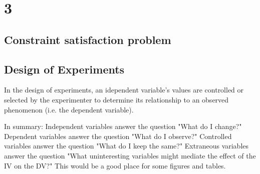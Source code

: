 \chapter{3}


\section{ Constraint satisfaction problem}

\section{Design of Experiments}
In the design of experiments, an idependent variable's values are controlled or
selected by the experimenter to determine its relationship to an observed
phenomenon (i.e. the dependent variable). 

In summary:
Independent variables answer the question "What do I change?"
Dependent variables answer the question "What do I observe?"
Controlled variables answer the question "What do I keep the same?"
Extraneous variables answer the question "What uninteresting variables might mediate the effect of the IV on the DV?"
This would be a good place for some figures and tables.
